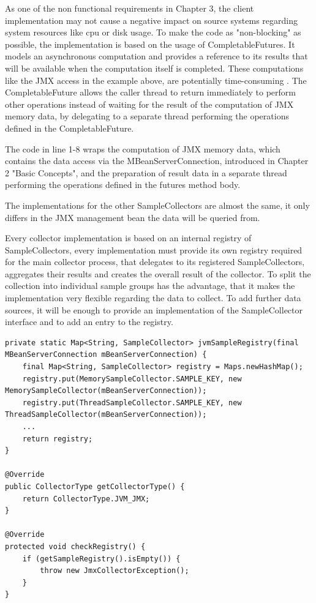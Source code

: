 As one of the non functional requirements in Chapter 3, the client implementation may not cause a negative impact
on source systems regarding system resources like cpu or disk usage. To make the code as "non-blocking" as possible,
the implementation is based on the usage of CompletableFutures. It models an asynchronous computation and provides
a reference to its results that will be available when the computation itself is completed. These computations like the JMX
access in the example above, are potentially time-consuming \cite{TODO}. The CompletableFuture allows the caller thread to return immediately
to perform other operations instead of waiting for the result of the computation of JMX memory data, by delegating to a
separate thread performing the operations defined in the CompletableFuture.

The code in line 1-8 wraps the computation of JMX memory data, which contains the data access via the MBeanServerConnection,
introduced in Chapter 2 "Basic Concepts", and the preparation of result data in a separate thread performing the operations defined
in the futures method body.

The implementations for the other SampleCollectors are almost the same, it only differs in the JMX management bean the data will
be queried from.

Every collector implementation is based on an internal registry of SampleCollectors, every implementation must provide its
own registry required for the main collector process, that delegates to its registered SampleCollectors,
aggregates their results and creates the overall result of the collector. To split the collection into individual sample groups has
the advantage, that it makes the implementation very flexible regarding the data to collect. To add further data sources, it
will be enough to provide an implementation of the SampleCollector interface and to add an entry to the registry.

\begin{lstlisting}[caption={Sample registry for "JvmCollector"}, captionpos=b, label={lst:jvmsampleregistry}]
private static Map<String, SampleCollector> jvmSampleRegistry(final MBeanServerConnection mBeanServerConnection) {
    final Map<String, SampleCollector> registry = Maps.newHashMap();
    registry.put(MemorySampleCollector.SAMPLE_KEY, new MemorySampleCollector(mBeanServerConnection));
    registry.put(ThreadSampleCollector.SAMPLE_KEY, new ThreadSampleCollector(mBeanServerConnection));
    ...
    return registry;
}

@Override
public CollectorType getCollectorType() {
    return CollectorType.JVM_JMX;
}

@Override
protected void checkRegistry() {
    if (getSampleRegistry().isEmpty()) {
        throw new JmxCollectorException();
    }
}
\end{lstlisting}

